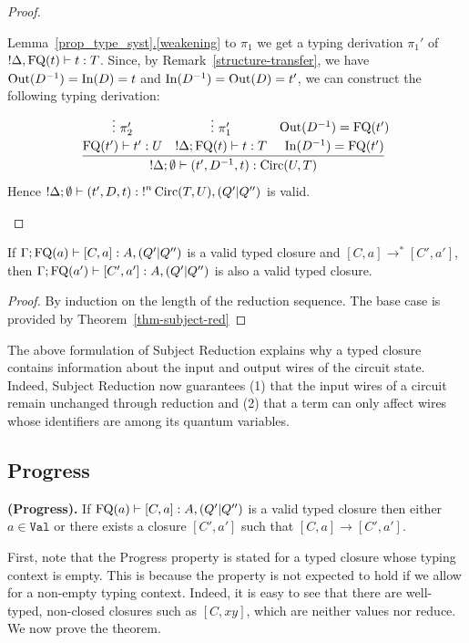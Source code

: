 \documentclass[twoside]{article}
\begin{document}
\begin{proof}
\begin{description}
\begin{itemize}
  Lemma~\hyperref[weakening]{\ref*{prop_type_syst}.\ref*{weakening}} to $\pi_1$ 
  we get a typing derivation $\pi_1'$ of ${!}\Delta ,\mathop{\textrm{FQ}}\nolimits(t)\vdash t:T$.
  Since, by 
  Remark~\hyperref[structure-transfer]{\ref*{structure-transfer}}, 
  we have $\mathop{\textrm{Out}}\nolimits(D^{-1})=\mathop{\textrm{In}}\nolimits(D)=t$ and $\mathop{\textrm{In}}\nolimits(D^{-1})=\mathop{\textrm{Out}}\nolimits(D)=t'$, we can construct 
  the following typing derivation:
  \[
  \infer[]{{!}\Delta ;\emptyset\entails (t',D^{-1},t):\Circ(U,T)}{
    \deduce[]{\FQ(t')\entails t':U}{
      \vdots ~\pi_2'
    }
    &
    \deduce[]{{!}\Delta;\FQ(t)\entails t:T}{
      \vdots ~\pi_1'     
    }
    &
    \deduce[]{\In(D^{-1})=\FQ(t')}{
      \Out(D^{-1})=\FQ(t')
    }
  }  
  \]
  Hence ${!}\Delta;\emptyset\vdash (t',D,t):{!}^n\mathop{\textrm{Circ}}\nolimits(T,U),(Q'|Q'')$ 
  is valid.    
\end{itemize}
\end{description}
\end{proof}

\begin{corollary}
If $\Gamma;\mathop{\textrm{FQ}}\nolimits(a)\vdash [C,a]:A,(Q'|Q'')$ is a valid typed closure 
and $[C,a]\to^* [C',a']$, then $\Gamma;\mathop{\textrm{FQ}}\nolimits(a')\vdash [C',a']:A,(Q'|Q'')$ 
is also a valid typed closure.
\end{corollary}

\begin{proof}
By induction on the length of the reduction sequence. The base case is 
provided by Theorem~\hyperref[thm-subject-red]{\ref*{thm-subject-red}}
\end{proof}

The above formulation of Subject Reduction explains why a typed closure contains 
information about the input and output wires of the circuit state. Indeed, 
Subject Reduction now guarantees (1) that the input wires of a circuit 
remain unchanged through reduction and (2) that a term can only affect 
wires whose identifiers are among its quantum variables.

\subsection{Progress}

\begin{theorem}
{\bf (Progress).}
If $\mathop{\textrm{FQ}}\nolimits(a)\vdash [C,a]:A,(Q'|Q'')$ is a valid typed closure then either 
$a\in\mathtt{Val}$ or there exists a closure $[C',a']$ such that 
$[C,a]\to [C',a']$.
\end{theorem}

First, note that the Progress property is stated for a typed closure
whose typing context is empty. This is because the property is not
expected to hold if we allow for a non-empty typing context. Indeed,
it is easy to see that there are well-typed, non-closed closures such
as $[C,xy]$, which are neither values nor reduce. 
We now prove the theorem.
\end{document}
